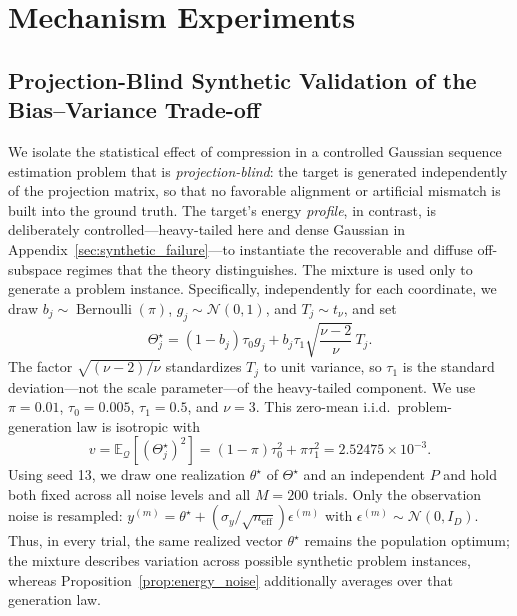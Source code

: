 \section{Mechanism Experiments}
\label{app:mechanism}
\subsection{Projection-Blind Synthetic Validation of the Bias--Variance Trade-off}
\label{sec:synthetic}

We isolate the statistical effect of compression in a controlled Gaussian sequence estimation problem that is \emph{projection-blind}: the target is generated independently of the projection matrix, so that no favorable alignment or artificial mismatch is built into the ground truth.
The target's energy \emph{profile}, in contrast, is deliberately controlled---heavy-tailed here and dense Gaussian in Appendix~\ref{sec:synthetic_failure}---to instantiate the recoverable and diffuse off-subspace regimes that the theory distinguishes.
The mixture is used only to generate a problem instance.
Specifically, independently for each coordinate, we draw
$b_j\sim\operatorname{Bernoulli}(\pi)$,
$g_j\sim\mathcal N(0,1)$, and $T_j\sim t_\nu$, and set
\begin{equation}
\Theta_j^\star
=
(1-b_j)\tau_0g_j
+
b_j\tau_1\sqrt{\frac{\nu-2}{\nu}}\,T_j .
\label{eq:synthetic_gt}
\end{equation}
The factor $\sqrt{(\nu-2)/\nu}$ standardizes $T_j$ to unit variance, so $\tau_1$ is the standard deviation---not the scale parameter---of the heavy-tailed component.
We use $\pi=0.01$, $\tau_0=0.005$, $\tau_1=0.5$, and $\nu=3$.
This zero-mean i.i.d.\ problem-generation law is isotropic with
\begin{equation}
v
=
\mathbb E_{\mathcal Q}[(\Theta_j^\star)^2]
=
(1-\pi)\tau_0^2+\pi\tau_1^2
=
2.52475\times10^{-3}.
\label{eq:synthetic_target_energy}
\end{equation}
Using seed 13, we draw one realization $\theta^\star$ of $\Theta^\star$ and an independent $P$ and hold both fixed across all noise levels and all $M=200$ trials.
Only the observation noise is resampled:
$y^{(m)}=\theta^\star+(\sigma_y/\sqrt{n_{\mathrm{eff}}})\epsilon^{(m)}$ with
$\epsilon^{(m)}\sim\mathcal N(0,I_D)$.
Thus, in every trial, the same realized vector $\theta^\star$ remains the population optimum; the mixture describes variation across possible synthetic problem instances, whereas Proposition~\ref{prop:energy_noise} additionally averages over that generation law.
